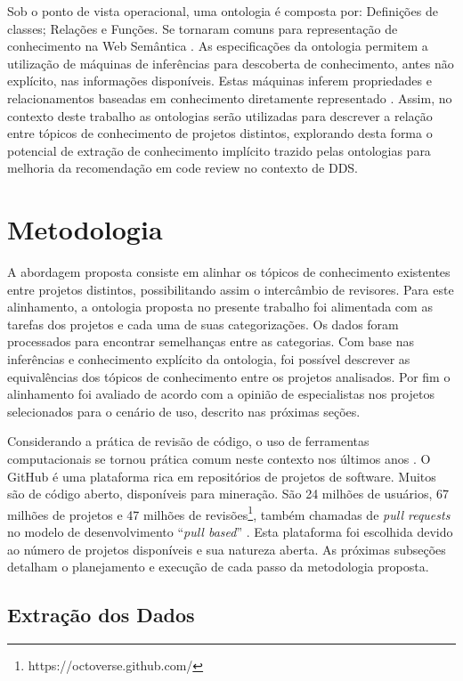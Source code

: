 \documentclass[peerreview]{acmart}
\begin{document}
Sob o ponto de vista operacional, uma ontologia é composta por: Definições de classes; Relações e Funções. Se tornaram comuns para representação de conhecimento na Web Semântica \cite{berners2001}. As especificações da ontologia permitem a utilização de máquinas de inferências para descoberta de conhecimento, antes não explícito, nas informações disponíveis. Estas máquinas inferem propriedades e relacionamentos baseadas em conhecimento diretamente representado \cite{berners2001}. Assim, no contexto deste trabalho as ontologias serão utilizadas para descrever a relação entre tópicos de conhecimento de projetos distintos, explorando desta forma o potencial de extração de conhecimento implícito trazido pelas ontologias para melhoria da recomendação em code review no contexto de DDS.

\section{Metodologia}

A abordagem proposta consiste em alinhar os tópicos de conhecimento existentes entre projetos distintos, possibilitando assim o intercâmbio de revisores. Para este alinhamento, a ontologia proposta no presente trabalho foi alimentada com  as tarefas dos projetos e cada uma de suas categorizações. Os dados foram processados para encontrar semelhanças entre as categorias. Com base nas inferências e conhecimento explícito da ontologia, foi possível descrever as equivalências dos tópicos de conhecimento entre os projetos analisados. Por fim o alinhamento foi avaliado de acordo com a opinião de especialistas nos projetos selecionados para o cenário de uso, descrito nas próximas seções.

Considerando a prática de revisão de código, o uso de ferramentas computacionais se tornou prática comum neste contexto nos últimos anos \cite{Bacchelli2013}. O GitHub é uma plataforma rica em repositórios de projetos de software. Muitos são de código aberto, disponíveis para mineração. São 24 milhões de usuários, 67 milhões de projetos e 47 milhões de revisões\footnote{https://octoverse.github.com/}, também chamadas de \textit{pull requests} no modelo de desenvolvimento ``\textit{pull based}'' \cite{gousios2014}. Esta plataforma foi escolhida devido ao número de projetos disponíveis e sua natureza aberta. As próximas subseções detalham o planejamento e execução de cada passo da metodologia proposta.

\subsection{Extração dos Dados}
\end{document}
